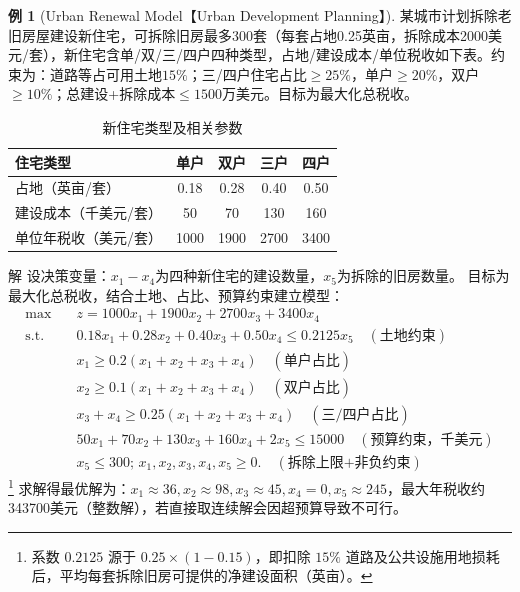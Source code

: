 \documentclass[12pt]{article}
\theoremstyle{plain}
\theoremstyle{definition}
\newtheorem{exm}{例}[subsection]
\newenvironment{slv}[1][解]{\begin{paragraph}{#1}\mbox{}}{\end{paragraph}\par\nopagebreak}
\newcommand{\st}{\mathrel{\text{s.t.}}}
\begin{document}
\begin{exm}[Urban Renewal Model【Urban Development Planning】]
    某城市计划拆除老旧房屋建设新住宅，可拆除旧房最多300套（每套占地0.25英亩，拆除成本2000美元/套），新住宅含单/双/三/四户四种类型，占地/建设成本/单位税收如下表。约束为：道路等占可用土地$15\%$；三/四户住宅占比$\geq25\%$，单户$\geq20\%$，双户$\geq10\%$；总建设+拆除成本$\leq1500$万美元。目标为最大化总税收。

    \begin{table}[!htbp]
    \centering
    \caption{新住宅类型及相关参数}
    \begin{tabular}{lcccc}
        \toprule
        住宅类型 & 单户 & 双户 & 三户 & 四户 \\
        \midrule
        占地（英亩/套） & 0.18 & 0.28 & 0.40 & 0.50 \\
        建设成本（千美元/套） & 50 & 70 & 130 & 160 \\
        单位年税收（美元/套） & 1000 & 1900 & 2700 & 3400 \\
        \bottomrule
    \end{tabular}
    \end{table}

    \begin{slv}
    设决策变量：$x_1-x_4$为四种新住宅的建设数量，$x_5$为拆除的旧房数量。
    目标为最大化总税收，结合土地、占比、预算约束建立模型：
    \begin{align*}
        \max \quad & z=1000x_1+1900x_2+2700x_3+3400x_4 \\
        \st \quad & 0.18x_1+0.28x_2+0.40x_3+0.50x_4 \leq 0.2125x_5 \quad (\text{土地约束}) \\
        & x_1 \geq 0.2(x_1+x_2+x_3+x_4) \quad (\text{单户占比}) \\
        & x_2 \geq 0.1(x_1+x_2+x_3+x_4) \quad (\text{双户占比}) \\
        & x_3+x_4 \geq 0.25(x_1+x_2+x_3+x_4) \quad (\text{三/四户占比}) \\
        & 50x_1+70x_2+130x_3+160x_4+2x_5 \leq 15000 \quad (\text{预算约束，千美元}) \\
        & x_5 \leq 300;\,x_1,x_2,x_3,x_4,x_5 \geq 0. \quad (\text{拆除上限+非负约束})
    \end{align*}
    \footnote{系数 $0.2125$ 源于 $0.25 \times (1-0.15)$，即扣除 $15\%$ 道路及公共设施用地损耗后，平均每套拆除旧房可提供的净建设面积（英亩）。}
    求解得最优解为：$x_1\approx36,x_2\approx98,x_3\approx45,x_4=0,x_5\approx245$，最大年税收约343700美元（整数解），若直接取连续解会因超预算导致不可行。
    \end{slv}
\end{exm}
\end{document}
